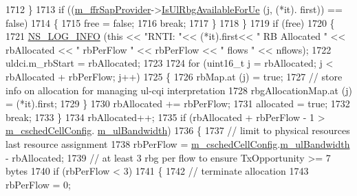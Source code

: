 \begin{DoxyCode}
1712                 \}
1713               \textcolor{keywordflow}{if} ((\hyperlink{classns3_1_1TdTbfqFfMacScheduler_a9db8ce15b6803fe859e5c2908cd00e14}{m\_ffrSapProvider}->\hyperlink{classns3_1_1LteFfrSapProvider_a3ef80840549b8ea3d50d2cef8a9866e2}{IsUlRbgAvailableForUe} (j, (*it).
      first)) == \textcolor{keyword}{false})
1714                 \{
1715                   free = \textcolor{keyword}{false};
1716                   \textcolor{keywordflow}{break};
1717                 \}
1718             \}
1719           \textcolor{keywordflow}{if} (free)
1720             \{
1721                   \hyperlink{group__logging_gafbd73ee2cf9f26b319f49086d8e860fb}{NS\_LOG\_INFO} (\textcolor{keyword}{this} << \textcolor{stringliteral}{"RNTI: "}<< (*it).first<< \textcolor{stringliteral}{" RB Allocated "} << rbAllocated 
      << \textcolor{stringliteral}{" rbPerFlow "} << rbPerFlow << \textcolor{stringliteral}{" flows "} << nflows);
1722               uldci.m\_rbStart = rbAllocated;
1723 
1724               \textcolor{keywordflow}{for} (uint16\_t j = rbAllocated; j < rbAllocated + rbPerFlow; j++)
1725                 \{
1726                   rbMap.at (j) = \textcolor{keyword}{true};
1727                   \textcolor{comment}{// store info on allocation for managing ul-cqi interpretation}
1728                   rbgAllocationMap.at (j) = (*it).first;
1729                 \}
1730               rbAllocated += rbPerFlow;
1731               allocated = \textcolor{keyword}{true};
1732               \textcolor{keywordflow}{break};
1733             \}
1734           rbAllocated++;
1735           \textcolor{keywordflow}{if} (rbAllocated + rbPerFlow - 1 > \hyperlink{classns3_1_1TdTbfqFfMacScheduler_a3ac3e4b1b3818ff204d6ff6c89c19f4d}{m\_cschedCellConfig}.
      \hyperlink{structns3_1_1FfMacCschedSapProvider_1_1CschedCellConfigReqParameters_a5ab5b102878e6e7e7727a14af4a64d2f}{m\_ulBandwidth})
1736             \{
1737               \textcolor{comment}{// limit to physical resources last resource assignment}
1738               rbPerFlow = \hyperlink{classns3_1_1TdTbfqFfMacScheduler_a3ac3e4b1b3818ff204d6ff6c89c19f4d}{m\_cschedCellConfig}.\hyperlink{structns3_1_1FfMacCschedSapProvider_1_1CschedCellConfigReqParameters_a5ab5b102878e6e7e7727a14af4a64d2f}{m\_ulBandwidth} - rbAllocated;
1739               \textcolor{comment}{// at least 3 rbg per flow to ensure TxOpportunity >= 7 bytes}
1740               \textcolor{keywordflow}{if} (rbPerFlow < 3)
1741                 \{
1742                   \textcolor{comment}{// terminate allocation}
1743                   rbPerFlow = 0;                 

\end{DoxyCode}
